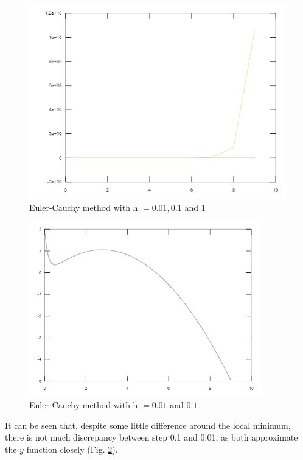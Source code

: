 \documentclass[a4paper,12pt]{article}
\begin{document}
\begin{figure}[htp]
    \centering
    \includegraphics[width=\textwidth]{euler_cauchy_all.png}
    \caption{Euler-Cauchy method with h $= 0.01, 0.1$ and $1$}
    \label{fig:euler_cauchy_all}
\end{figure}
\begin{figure}[htp]
    \centering
    \includegraphics[width=0.9\textwidth]{euler_cauchy_two.png}
    \caption{Euler-Cauchy method with h $= 0.01$ and $0.1$}
    \label{fig:euler_cauchy_two}
\end{figure}

It can be seen that, despite some little difference around the local minimum, there is not much discrepancy between step 0.1 and 0.01, as both approximate the $y$ function closely (Fig. \ref{fig:euler_cauchy_two}).
\end{document}
